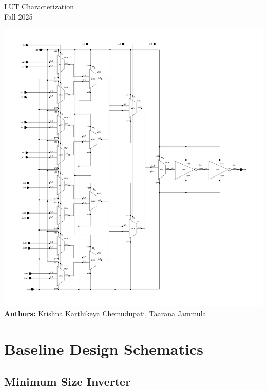 \documentclass[12pt]{article}
\begin{document}
\begin{titlepage}
    \centering
    \vspace*{0.1cm}
    {\huge LUT Characterization \\[0.5em]}
    {\large Fall 2025 \\[2em]}

    \includegraphics[width=\linewidth]{LUT_sch.png}\\[2em]

    \textbf{Authors:} Krishna Karthikeya Chemudupati, Taarana Jammula \\[2em]

    \vfill
\end{titlepage}

\tableofcontents
\newpage

\section{Baseline Design Schematics}

\subsection{Minimum Size Inverter}
\end{document}
